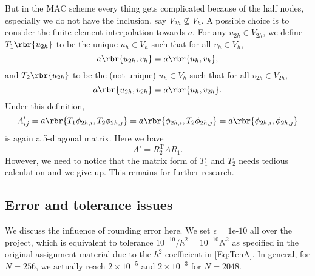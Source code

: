 \documentclass[english, nochinese]{pnote}
\begin{document}
But in the MAC scheme every thing gets complicated because of the half nodes, especially we do not have the inclusion, say $ V_{ 2 h } \nsubseteq V_h $. A possible choice is to consider the finite element interpolation towards $a$. For any $ u_{ 2 h } \in V_{ 2 h } $, we define $ T_1 \rbr{ u_{ 2 h } } $ to be the unique $ u_h \in V_h $ such that for all $ v_h \in V_h $,
\begin{equation}
a \rbr{ u_{ 2 h }, v_h } = a \rbr{ u_h, v_h };
\end{equation}
and $ T_2 \rbr{ u_{ 2 h } } $ to be the (not unique) $ u_h \in V_h $ such that for all $ v_{ 2 h } \in V_{ 2 h } $,
\begin{equation}
a \rbr{ u_{ 2 h }, v_{ 2 h } } = a \rbr{ u_h, v_{ 2 h } }.
\end{equation}
Under this definition,
\begin{equation}
A'_{ i j } = a \rbr{ T_1 \phi_{ 2 h, i }, T_2 \phi_{ 2 h, j } } = a \rbr{ \phi_{ 2 h, i }, T_2 \phi_{ 2 h, j } } = a \rbr{ \phi_{ 2 h, i }, \phi_{ 2 h, j } }
\end{equation}
is again a 5-diagonal matrix. Here we have
\begin{equation}
A' = R_2^{\text{T}} A R_1.
\end{equation}
However, we need to notice that the matrix form of $T_1$ and $T_2$ needs tedious calculation and we give up. This remains for further research.

\subsection{Error and tolerance issues} \label{SubSec:Err}

We discuss the influence of rounding error here. We set $ \epsilon = \text{1e-10} $ all over the project, which is equivalent to tolerance $ 10^{-10} / h^2 = 10^{-10} N^2 $ as specified in the original assignment material due to the $h^2$ coefficient in \eqref{Eq:TenA}. In general, for $ N = 256 $, we actually reach $ 2 \times 10^{-5} $ and $ 2 \times 10^{-3} $ for $ N = 2048 $.
\end{document}
